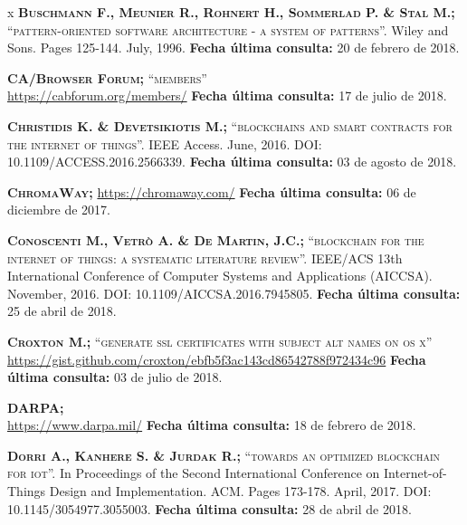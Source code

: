 \begin{thebibliography} {x}
	 \textsc{\textbf{Buschmann F., Meunier R., Rohnert H., Sommerlad P. \& Stal M.; }}\textsc{“pattern-oriented software architecture - a system of patterns”.} Wiley and Sons. Pages 125-144. July, 1996.
	\newline \textbf{Fecha última consulta:} 20 de febrero de 2018.
		
	 \textsc{\textbf{CA/Browser Forum; }}\textsc{“members”} \\ 
	\url{https://cabforum.org/members/}
	\newline \textbf{Fecha última consulta:} 17 de julio de 2018.
		
	 \textsc{\textbf{Christidis K. \& Devetsikiotis M.; }}\textsc{“blockchains and smart contracts for the internet of things”.} IEEE Access. June, 2016. DOI: 10.1109/ACCESS.2016.2566339. 
	\newline \textbf{Fecha última consulta:} 03 de agosto de 2018.
	
	 \textsc{\textbf{ChromaWay; }} 
	\url{https://chromaway.com/}
	\newline \textbf{Fecha última consulta:} 06 de diciembre de 2017.
	
	 \textsc{\textbf{Conoscenti M., Vetrò A. \& De Martin, J.C.; }}\textsc{“blockchain for the internet of things: a systematic literature review”.} IEEE/ACS 13th International Conference of Computer Systems and Applications (AICCSA). November, 2016. DOI: 10.1109/AICCSA.2016.7945805.
	\newline \textbf{Fecha última consulta:} 25 de abril de 2018.
	
	 \textsc{\textbf{Croxton M.; }}\textsc{“generate ssl certificates with subject alt names on os x”} \\ 
	\url{https://gist.github.com/croxton/ebfb5f3ac143cd86542788f972434c96}
	\newline \textbf{Fecha última consulta:} 03 de julio de 2018.
		
	 \textsc{\textbf{DARPA; }} \\ 
	\url{https://www.darpa.mil/}
	\newline \textbf{Fecha última consulta:} 18 de febrero de 2018.
		
	 \textsc{\textbf{Dorri A., Kanhere S. \& Jurdak R.; }}\textsc{“towards an optimized blockchain for iot”.} In Proceedings of the Second International Conference on Internet-of-Things Design and Implementation. ACM. Pages 173-178. April, 2017. DOI: 10.1145/3054977.3055003.
	\newline \textbf{Fecha última consulta:} 28 de abril de 2018.
		

\end{thebibliography}
